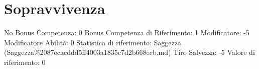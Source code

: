 \section{Sopravvivenza}\label{sopravvivenza}

\begin{description}
\tightlist
\item[Tags: ABI]
No Bonus Competenza: 0 Bonus Competenza di Riferimento: 1 Modificatore:
-5 Modificatore Abilità: 0 Statistica di riferimento: Saggezza
(Saggezza\%2087ecacddd5ff4003a1835c7d2b668ecb.md) Tiro Salvezza: -5
Valore di riferimento: 0
\end{description}
